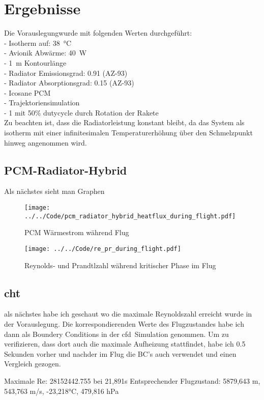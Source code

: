 \chapter{Ergebnisse}\label{chap:Ergebnisse}
Die Vorauslegungwurde mit folgenden Werten durchgeführt:\\
- Isotherm auf: \SI{38}{\celsius}\\
- Avionik Abwärme: \SI{40}{W}\\
- \SI{1}{m} Kontourlänge\\
- Radiator Emissionsgrad: \SI{0,91}{} (AZ-93)\\
- Radiator Absorptionsgrad: \SI{0,15}{} (AZ-93)\\
- Icosane PCM\\
- Trajektoriensimulation\\
- \SI{1}{} mit 50\% dutycycle durch Rotation der Rakete\\
Zu beachten ist, dass die Radiatorleistung konstant bleibt, da das System als isotherm mit einer
infinitesimalen Temperaturerhöhung über den Schmelzpunkt hinweg angenommen wird.
\section{PCM-Radiator-Hybrid}\label{sec:pcmRadiatorHybridErgebnisse}
Als nächstes sieht man Graphen
\begin{figure}[H]
  \centering
  \texttt{[image: ../../Code/pcm\_radiator\_hybrid\_heatflux\_during\_flight.pdf]}\label{fig:pcm_waermestrom_flugsimulation}
  \caption{PCM Wärmestrom während Flug}
  \texttt{[image: ../../Code/re\_pr\_during\_flight.pdf]}\label{fig:re_pr_flugsimulation}
  \caption{Reynolds- und Prandtlzahl während kritischer Phase im Flug}
\end{figure}
\section{\ac{cht}}
als nächstes habe ich geschaut wo die maximale Reynoldszahl erreicht wurde in der Vorauslegung. Die korrespondierenden Werte
des Flugzustandes habe ich dann als Boundery Conditions in der \ac{cfd}~Simulation genommen.
Um zu verifizieren, dass dort auch die maximale Aufheizung stattfindet, habe ich 0.5 Sekunden vorher und nachder
im Flug die BC's auch verwendet und einen Vergleich gezogen.

Maximale Re: 28152442.755 bei 21,891s
Entsprechender Flugzustand: 5879,643 m, 543,763 m/s, -23,218°C, 479,816 hPa